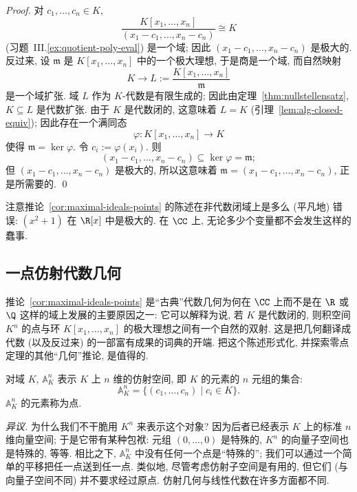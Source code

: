 \begin{proof}
对 $c_1,\ldots ,c_n\in K$,
\[
\frac{K[x_1,\ldots ,x_n]}{(x_1-c_1,\ldots ,x_n-c_n)}\cong K
\]
(习题~III.\ref{ex:quotient-poly-eval}) 是一个域; 因此 $(x_1-c_1,\ldots ,x_n-c_n)$ 是极大的. 反过来, 设 $\mathfrak{m}$ 是 $K[x_1,\ldots ,x_n]$ 中的一个极大理想, 于是商是一个域, 而自然映射
\[
K\to L:=\frac{K[x_1,\ldots ,x_n]}{\mathfrak{m}}
\]
是一个域扩张. 域 $L$ 作为 $K$-代数是有限生成的; 因此由定理~\ref{thm:nullstellensatz}, $K\subseteq L$ 是代数扩张. 由于 $K$ 是代数闭的, 这意味着 $L=K$ (引理~\ref{lem:alg-closed-equiv}); 因此存在一个满同态
\[
\varphi:K[x_1,\ldots ,x_n]\to K
\]
使得 $\mathfrak{m}=\ker\varphi$. 令 $c_i:=\varphi(x_i)$. 则
\[
(x_1-c_1,\ldots ,x_n-c_n)\subseteq\ker\varphi=\mathfrak{m};
\]
但 $(x_1-c_1,\ldots ,x_n-c_n)$ 是极大的, 所以这意味着 $\mathfrak{m}=(x_1-c_1,\ldots ,x_n-c_n)$, 正是所需要的. \qed
\end{proof}

注意推论~\ref{cor:maximal-ideals-points} 的陈述在非代数闭域上是多么 (平凡地) 错误: $(x^2+1)$ 在 $\R[x]$ 中是极大的. 在 $\CC$ 上, 无论多少个变量都不会发生这样的蠢事.

\subsection{一点仿射代数几何}
\label{subsec:affine-geometry}

推论~\ref{cor:maximal-ideals-points} 是``古典''代数几何为何在 $\CC$ 上而不是在 $\R$ 或 $\Q$ 这样的域上发展的主要原因之一: 它可以解释为说, 若 $K$ 是代数闭的, 则积空间 $K^n$ 的点与环 $K[x_1,\ldots ,x_n]$ 的极大理想之间有一个自然的双射. 这是把几何翻译成代数 (以及反过来) 的一部富有成果的词典的开端. 把这个陈述形式化, 并探索零点定理的其他``几何''推论, 是值得的.

对域 $K$, $\mathbb{A}_K^n$ 表示 $K$ 上 $n$ 维的仿射空间, 即 $K$ 的元素的 $n$ 元组的集合:
\[
\mathbb{A}_K^n=\{(c_1,\ldots ,c_n)\mid c_i\in K\}.
\]
$\mathbb{A}_K^n$ 的元素称为点.

\noindent\emph{异议.} 为什么我们不干脆用 $K^n$ 来表示这个对象? 因为后者已经表示 $K$ 上的标准 $n$ 维向量空间; 于是它带有某种包袱: 元组 $(0,\ldots ,0)$ 是特殊的, $K^n$ 的向量子空间也是特殊的, 等等. 相比之下, $\mathbb{A}_K^n$ 中没有任何一个点是``特殊的''; 我们可以通过一个简单的平移把任一点送到任一点. 类似地, 尽管考虑仿射子空间是有用的, 但它们 (与向量子空间不同) 并不要求经过原点. 仿射几何与线性代数在许多方面都不同.

